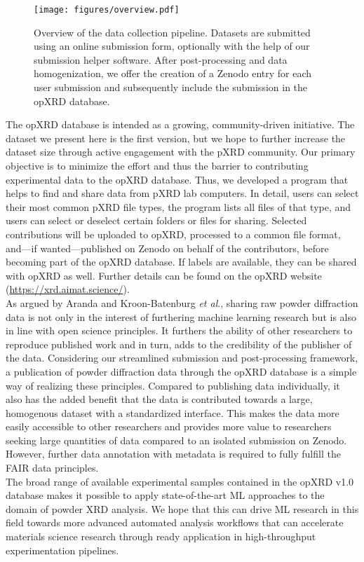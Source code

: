 \begin{figure}[!htb]
    \centering
    \texttt{[image: figures/overview.pdf]}
    \caption{Overview of the data collection pipeline. Datasets are submitted using an online submission form, optionally with the help of our submission helper software. After post-processing and data homogenization, we offer the creation of a Zenodo entry for each user submission and subsequently include the submission in the opXRD database.}
    \label{fig:overview}
\end{figure}

The opXRD database is intended as a growing, community-driven initiative. The dataset we present here is the first version, but we hope to further increase the dataset size through active engagement with the pXRD community. Our primary objective is to minimize the effort and thus the barrier to contributing experimental data to the opXRD database. Thus, we developed a program that helps to find and share data from pXRD lab computers. In detail, users can select their most common pXRD file types, the program lists all files of that type, and users can select or deselect certain folders or files for sharing. Selected contributions will be uploaded to opXRD, processed to a common file format, and---if wanted---published on Zenodo on behalf of the contributors, before becoming part of the opXRD database. If labels are available, they can be shared with opXRD as well. Further details can be found on the opXRD website (\url{https://xrd.aimat.science/}).  \\

As argued by Aranda and Kroon-Batenburg \textit{et al}.\cite{Aranda2018, Kroon-Batenburg2024}, sharing raw powder diffraction data is not only in the interest of furthering machine learning research but is also in line with open science principles. It furthers the ability of other researchers to reproduce published work and in turn, adds to the credibility of the publisher of the data. Considering our streamlined submission and post-processing framework, a publication of powder diffraction data through the opXRD database is a simple way of realizing these principles. Compared to publishing data individually, it also has the added benefit that the data is contributed towards a large, homogenous dataset with a standardized interface. This makes the data more easily accessible to other researchers and provides more value to researchers seeking large quantities of data compared to an isolated submission on Zenodo. However, further data annotation with metadata is required to fully fulfill the FAIR data principles.\\

The broad range of available experimental samples contained in the opXRD v1.0 database makes it possible to apply state-of-the-art ML approaches to the domain of powder XRD analysis. We hope that this can drive ML research in this field towards more advanced automated analysis workflows that can accelerate materials science research through ready application in high-throughput experimentation pipelines.\\